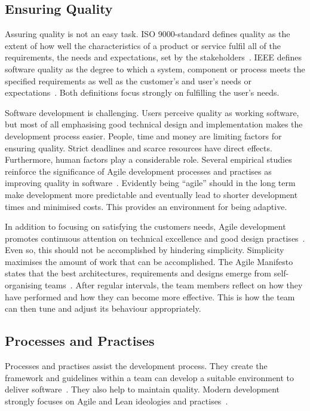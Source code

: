 \documentclass[english]{tktltiki2}
\begin{document}
\subsection{Ensuring Quality}

Assuring quality is not an easy task. ISO 9000-standard defines quality as the extent of how well the characteristics of a product or service fulfil all of the requirements, the needs and expectations, set by the stakeholders~\cite{ISO9000}. IEEE defines software quality as the degree to which a system, component or process meets the specified requirements as well as the customer’s and user’s needs or expectations~\cite{IEEE1074}. Both definitions focus strongly on fulfilling the user’s needs.

Software development is challenging. Users perceive quality as working software, but most of all emphasising good technical design and implementation makes the development process easier. People, time and money are limiting factors for ensuring quality. Strict deadlines and scarce resources have direct effects. Furthermore, human factors play a considerable role. Several empirical studies reinforce the significance of Agile development processes and practises as improving quality in software~\cite{SS10}. Evidently being “agile” should in the long term make development more predictable and eventually lead to shorter development times and minimised costs. This provides an environment for being adaptive.

In addition to focusing on satisfying the customers needs, Agile development promotes continuous attention on technical excellence and good design practises~\cite{BBB01b}. Even so, this should not be accomplished by hindering simplicity. Simplicity maximises the amount of work that can be accomplished. The Agile Manifesto states that the best architectures, requirements and designs emerge from self-organising teams~\cite{BBB01b}. After regular intervals, the team members reflect on how they have performed and how they can become more effective. This is how the team can then tune and adjust its behaviour appropriately.

\subsection{Processes and Practises}

Processes and practises assist the development process. They create the framework and guidelines within a team can develop a suitable environment to deliver software~\cite{Kni07}. They also help to maintain quality. Modern development strongly focuses on Agile and Lean ideologies and practises~\cite{Ono88, BBB01a, Fow05, Mon12}.
\end{document}
